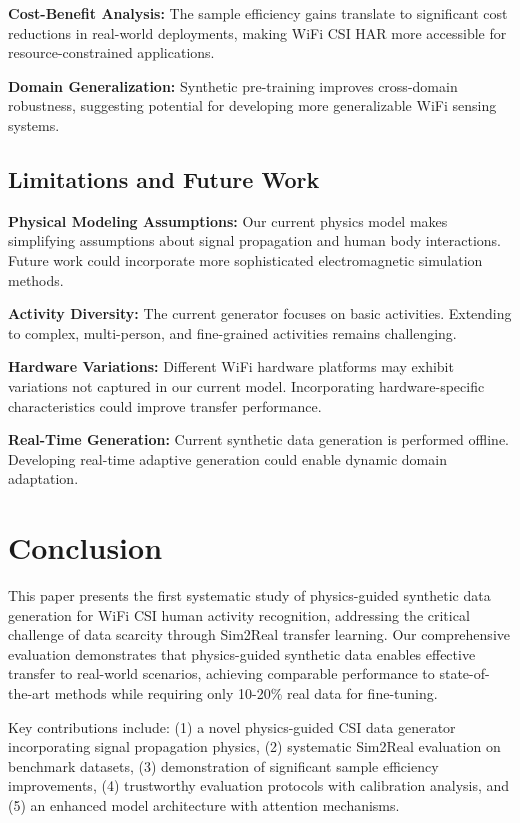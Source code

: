 \documentclass[journal]{IEEEtran}
\begin{document}
\textbf{Cost-Benefit Analysis:} The sample efficiency gains translate to significant cost reductions in real-world deployments, making WiFi CSI HAR more accessible for resource-constrained applications.

\textbf{Domain Generalization:} Synthetic pre-training improves cross-domain robustness, suggesting potential for developing more generalizable WiFi sensing systems.

\subsection{Limitations and Future Work}

\textbf{Physical Modeling Assumptions:} Our current physics model makes simplifying assumptions about signal propagation and human body interactions. Future work could incorporate more sophisticated electromagnetic simulation methods.

\textbf{Activity Diversity:} The current generator focuses on basic activities. Extending to complex, multi-person, and fine-grained activities remains challenging.

\textbf{Hardware Variations:} Different WiFi hardware platforms may exhibit variations not captured in our current model. Incorporating hardware-specific characteristics could improve transfer performance.

\textbf{Real-Time Generation:} Current synthetic data generation is performed offline. Developing real-time adaptive generation could enable dynamic domain adaptation.

\section{Conclusion}

This paper presents the first systematic study of physics-guided synthetic data generation for WiFi CSI human activity recognition, addressing the critical challenge of data scarcity through Sim2Real transfer learning. Our comprehensive evaluation demonstrates that physics-guided synthetic data enables effective transfer to real-world scenarios, achieving comparable performance to state-of-the-art methods while requiring only 10-20\% real data for fine-tuning.

Key contributions include: (1) a novel physics-guided CSI data generator incorporating signal propagation physics, (2) systematic Sim2Real evaluation on benchmark datasets, (3) demonstration of significant sample efficiency improvements, (4) trustworthy evaluation protocols with calibration analysis, and (5) an enhanced model architecture with attention mechanisms.
\end{document}
